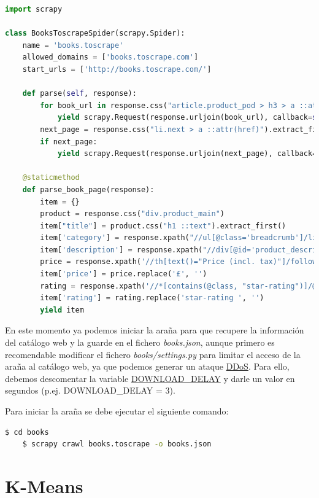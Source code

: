 \documentclass{uimppracticas}
\begin{document}
\begin{lstlisting}[language=python]
import scrapy

class BooksToscrapeSpider(scrapy.Spider):
	name = 'books.toscrape'
	allowed_domains = ['books.toscrape.com']
	start_urls = ['http://books.toscrape.com/']
	
	def parse(self, response):
		for book_url in response.css("article.product_pod > h3 > a ::attr(href)").extract():
			yield scrapy.Request(response.urljoin(book_url), callback=self.parse_book_page)
		next_page = response.css("li.next > a ::attr(href)").extract_first()
		if next_page:
			yield scrapy.Request(response.urljoin(next_page), callback=self.parse)
	
	@staticmethod
	def parse_book_page(response):
		item = {}
		product = response.css("div.product_main")
		item["title"] = product.css("h1 ::text").extract_first()
		item['category'] = response.xpath("//ul[@class='breadcrumb']/li[@class='active']/preceding-sibling::li[1]/a/text()").extract_first()
		item['description'] = response.xpath("//div[@id='product_description']/following-sibling::p/text()").extract_first()
		price = response.xpath('//th[text()="Price (incl. tax)"]/following-sibling::td/text()').extract_first()
		item['price'] = price.replace('£', '')
		rating = response.xpath('//*[contains(@class, "star-rating")]/@class').extract_first()
		item['rating'] = rating.replace('star-rating ', '')
		yield item
\end{lstlisting}

En este momento ya podemos iniciar la araña para que recupere la información del catálogo web y la guarde en el fichero \textit{books.json}, aunque primero es recomendable modificar el fichero \textit{books/settings.py} para limitar el acceso de la araña al catálogo web, ya que podemos generar un ataque \href{https://es.wikipedia.org/wiki/Ataque_de_denegaci%C3%B3n_de_servicio}{DDoS}. Para ello, debemos descomentar la variable \href{https://docs.scrapy.org/en/latest/topics/settings.html#download-delay}{DOWNLOAD\_DELAY} y darle un valor en segundos (p.ej. DOWNLOAD\_DELAY = 3). 
	
Para iniciar la araña se debe ejecutar el siguiente comando:	
	
\begin{lstlisting}[language=bash]
	$ cd books
	$ scrapy crawl books.toscrape -o books.json
\end{lstlisting}

\section{K-Means}\label{kmeans} 
\end{document}
